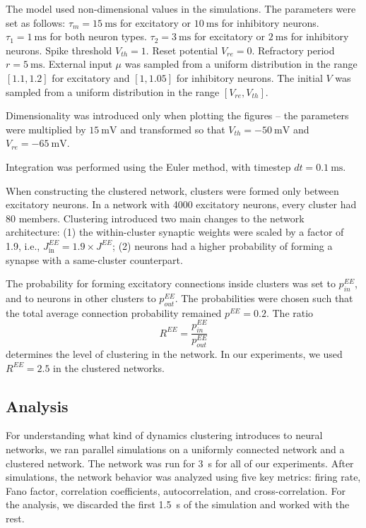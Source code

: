 The model used non-dimensional values in the simulations. 
The parameters were set as follows:
$\tau_m = \SI{15}{\ms}$ for excitatory or $\SI{10}{\ms}$ for inhibitory neurons.
$\tau_1 = \SI{1}{\ms}$ for both neuron types.
$\tau_2 = \SI{3}{\ms}$ for excitatory or $\SI{2}{\ms}$ for inhibitory neurons.
Spike threshold $V_{th} = 1$.
Reset potential $V_{re} = 0$.
Refractory period $r = \SI{5}{\ms}$.
External input $\mu$ was sampled from a uniform distribution in the range $[1.1,1.2]$ for excitatory and $[1,1.05]$ for inhibitory neurons.
The initial $V$ was sampled from a uniform distribution in the range $[V_{re}, V_{th}]$.

Dimensionality was introduced only when plotting the figures -- the parameters were multiplied by $\SI{15}{\mV}$ and transformed so that $V_{th} = \SI{-50}{\mV}$ and $V_{re} = \SI{-65}{\mV}$.

Integration was performed using the Euler method, with timestep $dt = \SI{0.1}{\ms}$.

When constructing the clustered network, clusters were formed only between excitatory neurons. In a network with 4000 excitatory neurons, every cluster had 80 members. Clustering introduced two main changes to the network architecture: (1) the within-cluster synaptic weights were scaled by a factor of 1.9, i.e., $J_{\text{in}}^{EE} = 1.9 \times J^{EE}$; (2) neurons had a higher probability of forming a synapse with a same-cluster counterpart.

The probability for forming excitatory connections inside clusters was set to $p_{in}^{EE}$, and to neurons in other clusters to $p_{out}^{EE}$. The probabilities were chosen such that the total average connection probability remained $p^{EE} = 0.2$. The ratio
\begin{equation}
\label{eq:ree_ratio}
R^{EE} = \frac{p_{in}^{EE}}{p_{out}^{EE}}
\end{equation}
determines the level of clustering in the network. In our experiments, we used $R^{EE} = 2.5$ in the clustered networks.


\subsection{Analysis}
\label{sec:analysis}

For understanding what kind of dynamics clustering introduces to neural networks, we ran parallel simulations on a uniformly connected network and a clustered network. The network was run for \SI{3}{\s} for all of our experiments. After simulations, the network behavior was analyzed using five key metrics: firing rate, Fano factor, correlation coefficients, autocorrelation, and cross-correlation. For the analysis, we discarded the first \SI{1.5}{\s} of the simulation and worked with the rest.

